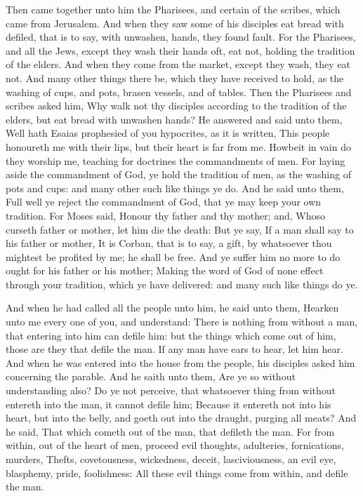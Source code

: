  Then came together unto him the Pharisees, and certain of
the scribes, which came from Jerusalem.  And when they saw
some of his disciples eat bread with defiled, that is to say, with
unwashen, hands, they found fault.  For the Pharisees, and
all the Jews, except they wash their hands oft, eat not, holding the
tradition of the elders.  And when they come from the
market, except they wash, they eat not. And many other things there be,
which they have received to hold, as the washing of cups, and pots,
brasen vessels, and of tables.  Then the Pharisees and
scribes asked him, Why walk not thy disciples according to the tradition
of the elders, but eat bread with unwashen hands?  He
answered and said unto them, Well hath Esaias prophesied of you
hypocrites, as it is written, This people honoureth me with their lips,
but their heart is far from me.  Howbeit in vain do they
worship me, teaching for doctrines the commandments of men.
 For laying aside the commandment of God, ye hold the
tradition of men, as the washing of pots and cups: and many other such
like things ye do.  And he said unto them, Full well ye
reject the commandment of God, that ye may keep your own tradition.
 For Moses said, Honour thy father and thy mother; and,
Whoso curseth father or mother, let him die the death: 
But ye say, If a man shall say to his father or mother, It is Corban,
that is to say, a gift, by whatsoever thou mightest be profited by me;
he shall be free.  And ye suffer him no more to do ought
for his father or his mother;  Making the word of God of
none effect through your tradition, which ye have delivered: and many
such like things do ye.

 And when he had called all the people unto him, he said
unto them, Hearken unto me every one of you, and understand:
 There is nothing from without a man, that entering into
him can defile him: but the things which come out of him, those are they
that defile the man.  If any man have ears to hear, let
him hear.  And when he was entered into the house from
the people, his disciples asked him concerning the parable.
 And he saith unto them, Are ye so without understanding
also? Do ye not perceive, that whatsoever thing from without entereth
into the man, it cannot defile him;  Because it entereth
not into his heart, but into the belly, and goeth out into the draught,
purging all meats?  And he said, That which cometh out of
the man, that defileth the man.  For from within, out of
the heart of men, proceed evil thoughts, adulteries, fornications,
murders,  Thefts, covetousness, wickedness, deceit,
lasciviousness, an evil eye, blasphemy, pride, foolishness:
 All these evil things come from within, and defile the
man.

